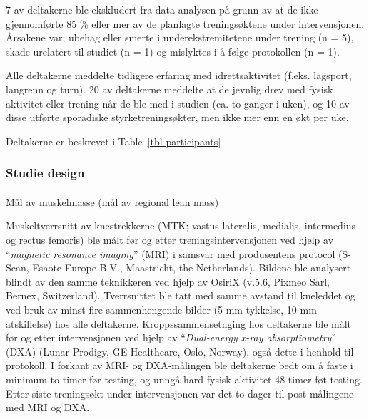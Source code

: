 \documentclass[
  letterpaper,
  DIV=11,
  numbers=noendperiod]{scrreprt}
\makeatletter
\let\oldparagraph\paragraph
\renewcommand{\paragraph}{
    \@ifstar
      \xxxParagraphStar
      \xxxParagraphNoStar
  }
\newcommand{\xxxParagraphStar}[1]{\oldparagraph*{#1}\mbox{}}
\newcommand{\xxxParagraphNoStar}[1]{\oldparagraph{#1}\mbox{}}
\makeatother
\begin{document}
7 av deltakerne ble ekskludert fra data-analysen på grunn av at de ikke
gjennomførte 85 \% eller mer av de planlagte treningsøktene under
intervensjonen. Årsakene var; ubehag eller smerte i underekstremitetene
under trening (n = 5), skade urelatert til studiet (n = 1) og mislyktes
i å følge protokollen (n = 1).

Alle deltakerne meddelte tidligere erfaring med idrettsaktivitet (f.eks.
lagsport, langrenn og turn). 20 av deltakerne meddelte at de jevnlig
drev med fysisk aktivitet eller trening når de ble med i studien (ca. to
ganger i uken), og 10 av disse utførte sporadiske styrketreningsøkter,
men ikke mer enn en økt per uke.

Deltakerne er beskrevet i Table~\ref{tbl-participants}

\begin{table}

\caption{\label{tbl-participants}Deltakeroversikt}


\end{table}%

\subsubsection{Studie design}\label{studie-design}

\paragraph{Mål av muskelmasse (mål av regional lean
mass)}\label{muxe5l-av-muskelmasse-muxe5l-av-regional-lean-mass}

Muskeltverrsnitt av knestrekkerne (MTK; vastus lateralis, medialis,
intermedius og rectus femoris) ble målt før og etter
treningsintervensjonen ved hjelp av ``\emph{magnetic resonance
imaging}'' (MRI) i samsvar med produsentens protocol (S-Scan, Esaote
Europe B.V., Maastricht, the Netherlands). Bildene ble analysert blindt
av den samme teknikkeren ved hjelp av OsiriX (v.5.6, Pixmeo Sarl,
Bernex, Switzerland). Tverrsnittet ble tatt med samme avstand til
kneleddet og ved bruk av minst fire sammenhengende bilder (5 mm
tykkelse, 10 mm atskillelse) hos alle deltakerne. Kroppssammensetnging
hos deltakerne ble målt før og etter intervensjonen ved hjelp av
``\emph{Dual-energy x-ray absorptiometry}'' (DXA) (Lunar Prodigy, GE
Healthcare, Oslo, Norway), også dette i henhold til protokoll. I forkant
av MRI- og DXA-målingen ble deltakerne bedt om å faste i minimum to
timer før testing, og unngå hard fysisk aktivitet 48 timer føt testing.
Etter siste treningsøkt under intervensjonen var det to dager til
post-målingene med MRI og DXA.
\end{document}
